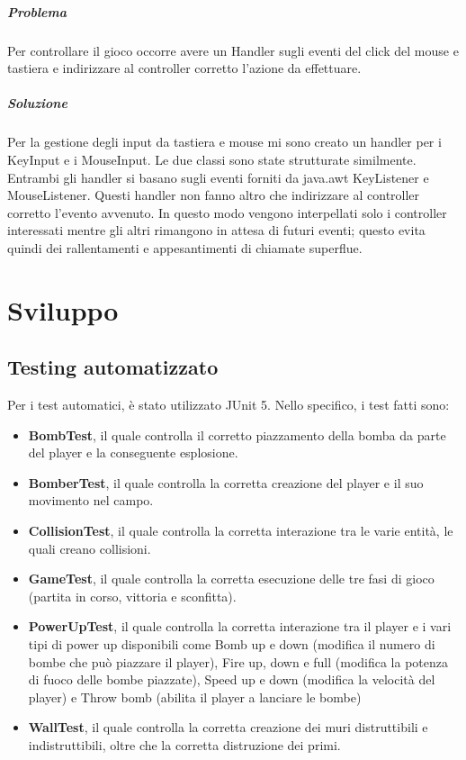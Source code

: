 \documentclass[a4paper,12pt]{report}
\begin{document}
\paragraph{Problema} Per controllare il gioco occorre avere un Handler sugli eventi del click del mouse e tastiera e indirizzare al controller corretto l’azione da effettuare. 
\paragraph{Soluzione} Per la gestione degli input da tastiera e mouse mi sono creato un handler per i KeyInput e i MouseInput. Le due classi sono state strutturate similmente. Entrambi gli handler si basano sugli eventi forniti da java.awt KeyListener e MouseListener. Questi handler non fanno altro che indirizzare al controller corretto l’evento avvenuto. In questo modo vengono interpellati solo i controller interessati mentre gli altri rimangono in attesa di futuri eventi; questo evita quindi dei rallentamenti e appesantimenti di chiamate superflue.

\chapter{Sviluppo}
\section{Testing automatizzato}
Per i test automatici, è stato utilizzato JUnit 5.
Nello specifico, i test fatti sono:
\begin{itemize}
    \item \textbf{BombTest}, il quale controlla il corretto piazzamento della bomba da parte del player e la conseguente esplosione.
    \item \textbf{BomberTest}, il quale controlla la corretta creazione del player e il suo movimento nel campo.
    \item \textbf{CollisionTest}, il quale controlla la corretta interazione tra le varie entità, le quali creano collisioni.
    \item \textbf{GameTest}, il quale controlla la corretta esecuzione delle tre fasi di gioco (partita in corso, vittoria e sconfitta).
    \item \textbf{PowerUpTest}, il quale controlla la corretta interazione tra il player e i vari tipi di power up disponibili come Bomb up e down (modifica il numero di bombe che può piazzare il player), Fire up, down e full (modifica la potenza di fuoco delle bombe piazzate), Speed up e down (modifica la velocità del player) e Throw bomb (abilita il player a lanciare le bombe)
    \item \textbf{WallTest}, il quale controlla la corretta creazione dei muri distruttibili e indistruttibili, oltre che la corretta distruzione dei primi.
\end{itemize}
\end{document}
